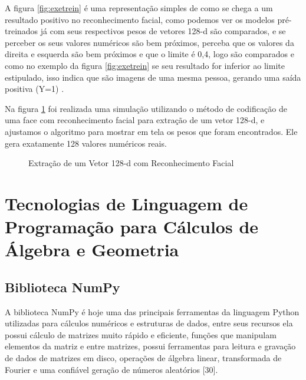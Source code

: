 A figura \ref{fig:exetrein} é uma representação simples de como se chega a um resultado positivo no reconhecimento facial, como podemos ver os modelos pré-treinados já com seus respectivos pesos de vetores 128-d são comparados, e se perceber os seus valores numéricos são bem próximos, perceba que os valores da direita e esquerda são bem próximos e que o limite é 0,4, logo são comparados e como no exemplo da figura \ref{fig:exetrein} se seu resultado for inferior ao limite estipulado, isso indica que são imagens de uma mesma pessoa, gerando uma saída positiva (Y=1) \cite{adamgeitgey}.

Na figura \ref{fig:ext128d} foi realizada uma simulação utilizando o método de codificação de uma face com reconhecimento facial para extração de um vetor 128-d, e ajustamos o algoritmo para mostrar em tela os pesos que foram encontrados. Ele gera exatamente 128 valores numéricos reais. 

\begin{figure}[H]
	\centering
	\caption{Extração de um Vetor 128-d com Reconhecimento Facial}
	\fontsize{9pt}{12pt}\selectfont
	\def\svgwidth{11cm}
	
	\label{fig:ext128d}
\end{figure}

\section{Tecnologias de Linguagem de Programação para Cálculos de Álgebra e Geometria}

\subsection{Biblioteca NumPy}
A biblioteca NumPy é hoje uma das principais ferramentas da linguagem Python utilizadas para cálculos numéricos e estruturas de dados, entre seus recursos ela possui cálculo de matrizes muito rápido e eficiente, funções que manipulam elementos da matriz e entre matrizes, possui ferramentas para leitura e gravação de dados de matrizes em disco, operações de álgebra linear, transformada de Fourier e uma confiável geração de números aleatórios [30]. 

